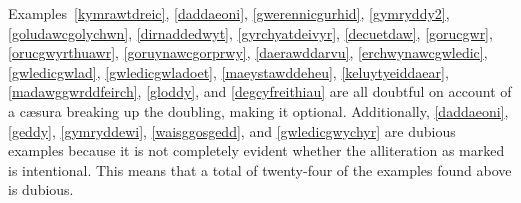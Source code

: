 Examples~\ref{kymrawtdreic},   \ref{daddaeoni},  \ref{gwerennicgurhid},  \ref{gymryddy2}, \ref{goludawcgolychwn},  \ref{dirnaddedwyt},  \ref{gyrchyatdeivyr},  \ref{decuetdaw},  \ref{gorucgwr},  \ref{orucgwyrthuawr},  \ref{goruynawcgorprwy},  \ref{daerawddarvu},  \ref{erchwynawcgwledic},  \ref{gwledicgwlad},  \ref{gwledicgwladoet},  \ref{maeystawddeheu},  \ref{keluytyeiddaear},  \ref{madawggwrddfeirch}, \ref{gloddy}, and \ref{degcyfreithiau} are all doubtful on account of a cæsura breaking up the doubling, making it optional. Additionally, \ref{daddaeoni}, \ref{geddy}, \ref{gymryddewi}, \ref{waisggosgedd}, and \ref{gwledicgwychyr} are dubious examples because it is not completely evident whether the alliteration as marked is intentional. This means that a total of twenty-four of the examples found above is dubious.

